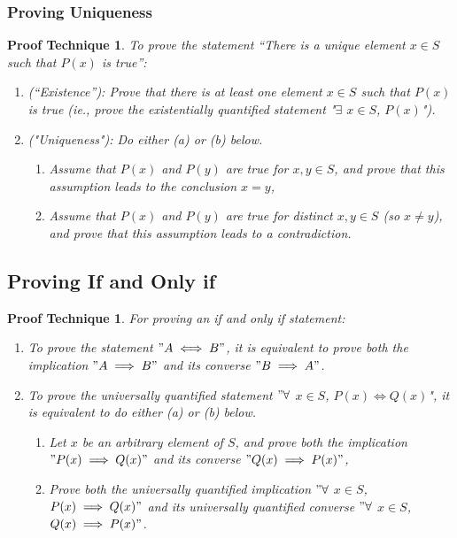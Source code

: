\documentclass[10pt]{article}
\theoremstyle{break}
\newtheorem{pt}[thm]{Proof Technique}
\begin{document}
\subsubsection{Proving Uniqueness}
\begin{pt}
    To prove the statement “There is a unique element $x \in S$ such that $P(x)$ is true”:
    \begin{enumerate}
        \item[1.] (“Existence”): Prove that there is at least one element $x \in S$ such that $P(x)$ is true (ie., prove the existentially quantified statement "$\exists$ $x \in S$, $P(x)$").
        \item[2.] ("Uniqueness"): Do either (a) or (b) below.
            \begin{enumerate}
                \item Assume that $P(x)$ and $P(y)$ are true for $x, y \in S$, and prove that this assumption leads to the conclusion $x = y$,
                \item Assume that $P(x)$ and $P(y)$ are true for distinct $x, y \in S$ (so $x \ne y$), and prove that this assumption leads to a contradiction.
            \end{enumerate}
    \end{enumerate}
\end{pt}

\subsection{Proving If and Only if}
\begin{pt}
    For proving an if and only if statement:
    \begin{enumerate}
        \item To prove the statement $"A \iff B"$, it is equivalent to prove both the implication $"A \implies B"$ and its converse $"B \implies A"$.
        \item To prove the universally quantified statement $"\forall$ $x \in S$, $P(x) \iff Q(x)$", it is equivalent to do either (a) or (b) below.
        \begin{enumerate}
            \item Let $x$ be an arbitrary element of $S$, and prove both the implication $"P(x) \implies Q(x)"$ and its converse $"Q(x) \implies P(x)"$, 
            \item Prove both the universally quantified implication $"\forall$ $x \in S$, $P(x) \implies Q(x)"$ and its universally quantified converse $"\forall$ $x \in S$, $Q(x) \implies P(x)"$.
        \end{enumerate} 
    \end{enumerate}
\end{pt}
\end{document}
